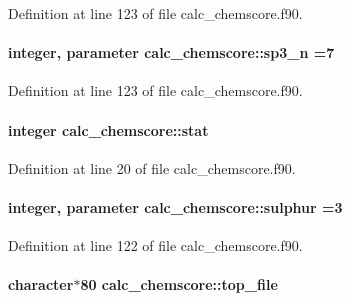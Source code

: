Definition at line 123 of file calc\-\_\-chemscore.\-f90.

\hypertarget{classcalc__chemscore_a09ae8a1f9f2ef13e71fcec99d065126d}{
\paragraph[{sp3\-\_\-n}]{\setlength{\rightskip}{0pt plus 5cm}integer, parameter calc\-\_\-chemscore\-::sp3\-\_\-n =7}}\label{classcalc__chemscore_a09ae8a1f9f2ef13e71fcec99d065126d}


Definition at line 123 of file calc\-\_\-chemscore.\-f90.

\hypertarget{classcalc__chemscore_a3b2724ed780bdae65bbbec15ac8422c8}{
\paragraph[{stat}]{\setlength{\rightskip}{0pt plus 5cm}integer calc\-\_\-chemscore\-::stat}}\label{classcalc__chemscore_a3b2724ed780bdae65bbbec15ac8422c8}


Definition at line 20 of file calc\-\_\-chemscore.\-f90.

\hypertarget{classcalc__chemscore_a95d7b76641cfc63037276718a6c0d409}{
\paragraph[{sulphur}]{\setlength{\rightskip}{0pt plus 5cm}integer, parameter calc\-\_\-chemscore\-::sulphur =3}}\label{classcalc__chemscore_a95d7b76641cfc63037276718a6c0d409}


Definition at line 122 of file calc\-\_\-chemscore.\-f90.

\hypertarget{classcalc__chemscore_a6c1dfab249f0271c1032ed943ecb6d86}{
\paragraph[{top\-\_\-file}]{\setlength{\rightskip}{0pt plus 5cm}character$\ast$80 calc\-\_\-chemscore\-::top\-\_\-file}}\label{classcalc__chemscore_a6c1dfab249f0271c1032ed943ecb6d86}


